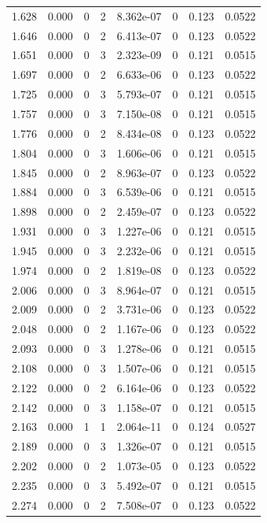 \documentclass[preview]{standalone}
\begin{document}
{{{\begin{tabular}{L{1.2cm}C{1.2cm} C{0.3cm}C{0.5cm} C{1.4cm}C{1.4cm} C{1.4cm}C{1.4cm}}
  1.628  &  0.000  & 0     &  2 &  8.362e-07  & 0  & 0.123 &  0.0522   \\ 
  1.646  &  0.000  & 0     &  2 &  6.413e-07  & 0  & 0.123 &  0.0522   \\ 
  1.651  &  0.000  & 0     &  3 &  2.323e-09  & 0  & 0.121 &  0.0515   \\ 
  1.697  &  0.000  & 0     &  2 &  6.633e-06  & 0  & 0.123 &  0.0522   \\ 
  1.725  &  0.000  & 0     &  3 &  5.793e-07  & 0  & 0.121 &  0.0515   \\ 
  1.757  &  0.000  & 0     &  3 &  7.150e-08  & 0  & 0.121 &  0.0515   \\ 
  1.776  &  0.000  & 0     &  2 &  8.434e-08  & 0  & 0.123 &  0.0522   \\ 
  1.804  &  0.000  & 0     &  3 &  1.606e-06  & 0  & 0.121 &  0.0515   \\ 
  1.845  &  0.000  & 0     &  2 &  8.963e-07  & 0  & 0.123 &  0.0522   \\ 
  1.884  &  0.000  & 0     &  3 &  6.539e-06  & 0  & 0.121 &  0.0515   \\ 
  1.898  &  0.000  & 0     &  2 &  2.459e-07  & 0  & 0.123 &  0.0522   \\ 
  1.931  &  0.000  & 0     &  3 &  1.227e-06  & 0  & 0.121 &  0.0515   \\ 
  1.945  &  0.000  & 0     &  3 &  2.232e-06  & 0  & 0.121 &  0.0515   \\ 
  1.974  &  0.000  & 0     &  2 &  1.819e-08  & 0  & 0.123 &  0.0522   \\ 
  2.006  &  0.000  & 0     &  3 &  8.964e-07  & 0  & 0.121 &  0.0515   \\ 
  2.009  &  0.000  & 0     &  2 &  3.731e-06  & 0  & 0.123 &  0.0522   \\ 
  2.048  &  0.000  & 0     &  2 &  1.167e-06  & 0  & 0.123 &  0.0522   \\ 
  2.093  &  0.000  & 0     &  3 &  1.278e-06  & 0  & 0.121 &  0.0515   \\ 
  2.108  &  0.000  & 0     &  3 &  1.507e-06  & 0  & 0.121 &  0.0515   \\ 
  2.122  &  0.000  & 0     &  2 &  6.164e-06  & 0  & 0.123 &  0.0522   \\ 
  2.142  &  0.000  & 0     &  3 &  1.158e-07  & 0  & 0.121 &  0.0515   \\ 
  2.163  &  0.000  & 1     &  1 &  2.064e-11  & 0  & 0.124 &  0.0527   \\ 
  2.189  &  0.000  & 0     &  3 &  1.326e-07  & 0  & 0.121 &  0.0515   \\ 
  2.202  &  0.000  & 0     &  2 &  1.073e-05  & 0  & 0.123 &  0.0522   \\ 
  2.235  &  0.000  & 0     &  3 &  5.492e-07  & 0  & 0.121 &  0.0515   \\ 
  2.274  &  0.000  & 0     &  2 &  7.508e-07  & 0  & 0.123 &  0.0522   \\ 
\hline 
\end{tabular} 

}}}
\end{document}
